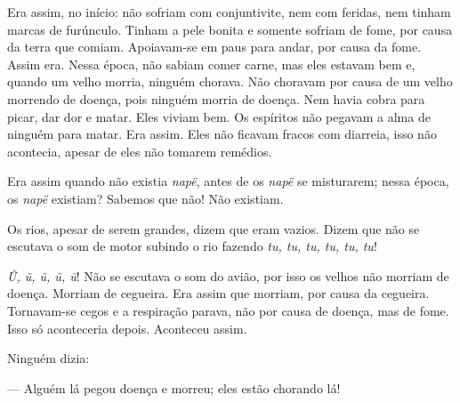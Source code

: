 Era assim, no início: não sofriam com conjuntivite, nem com feridas, nem
tinham marcas de furúnculo. Tinham a pele bonita e somente sofriam de
fome, por causa da terra que comiam. Apoiavam-se em paus para andar, por
causa da fome. Assim era. Nessa época, não sabiam comer carne, mas eles
estavam bem e, quando um velho morria, ninguém chorava. Não choravam por
causa de um velho morrendo de doença, pois ninguém morria de doença. Nem
havia cobra para picar, dar dor e matar. Eles viviam bem. Os espíritos
não pegavam a alma de ninguém para matar. Era assim. Eles não ficavam
fracos com diarreia, isso não acontecia, apesar de eles não tomarem
remédios. 

Era assim quando não existia \textit{napë}, antes de os \textit{napë} se
misturarem; nessa época, os \textit{napë} existiam? Sabemos que não! Não
existiam. 

Os rios, apesar de serem grandes, dizem que eram vazios. Dizem que não
se escutava o som de motor subindo o rio fazendo \textit{tu, tu, tu, tu, tu,
tu}!

\textit{Ũ, ũ, ũ, ũ, ũ}! Não se escutava o som do avião, por isso os velhos
não morriam de doença. Morriam de cegueira. Era assim que morriam, por
causa da cegueira. Tornavam-se cegos e a respiração parava, não por
causa de doença, mas de fome. Isso só aconteceria depois. Aconteceu
assim. 

Ninguém dizia:

--- Alguém lá pegou doença e morreu; eles estão chorando lá! 



